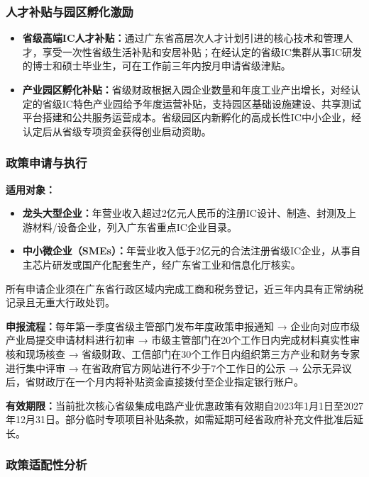 \documentclass[12pt,a4paper]{article}
\begin{document}
\subsubsection{人才补贴与园区孵化激励}

\begin{itemize}
    \item \textbf{省级高端IC人才补贴：}通过广东省高层次人才计划引进的核心技术和管理人才，享受一次性省级生活补贴和安居补贴；在经认定的省级IC集群从事IC研发的博士和硕士毕业生，可在工作前三年内按月申请省级津贴。
    \item \textbf{产业园区孵化补贴：}省级财政根据入园企业数量和年度工业产出增长，对经认定的省级IC特色产业园给予年度运营补贴，支持园区基础设施建设、共享测试平台搭建和公共服务运营成本。省级园区内新孵化的高成长性IC中小企业，经认定后从省级专项资金获得创业启动资助。
\end{itemize}

\subsubsection{政策申请与执行}

\textbf{适用对象：}
\begin{itemize}
    \item \textbf{龙头大型企业：}年营业收入超过2亿元人民币的注册IC设计、制造、封测及上游材料/设备企业，列入广东省重点IC企业目录。
    \item \textbf{中小微企业（SMEs）：}年营业收入低于2亿元的合法注册省级IC企业，从事自主芯片研发或国产化配套生产，经广东省工业和信息化厅核实。
\end{itemize}
所有申请企业须在广东省行政区域内完成工商和税务登记，近三年内具有正常纳税记录且无重大行政处罚。

\textbf{申报流程：}每年第一季度省级主管部门发布年度政策申报通知 → 企业向对应市级产业局提交申请材料进行初审 → 市级主管部门在20个工作日内完成材料真实性审核和现场核查 → 省级财政、工信部门在30个工作日内组织第三方产业和财务专家进行集中评审 → 在省政府官方网站进行不少于7个工作日的公示 → 公示无异议后，省财政厅在一个月内将补贴资金直接拨付至企业指定银行账户。

\textbf{有效期限：}当前批次核心省级集成电路产业优惠政策有效期自2023年1月1日至2027年12月31日。部分临时专项项目补贴条款，如需延期可经省政府补充文件批准后延长。

\subsubsection{政策适配性分析}
\end{document}
